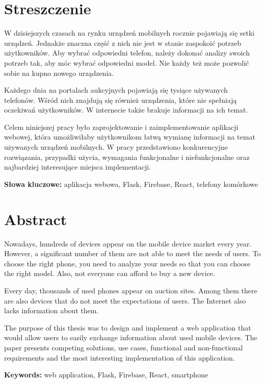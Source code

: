 \section*{Streszczenie}
W dzisiejszych czasach na rynku urządzeń mobilnych rocznie pojawiają się setki urządzeń. Jednakże znaczna część z nich nie jest w stanie zaspokoić potrzeb użytkowników. Aby wybrać odpowiedni telefon, należy dokonać analizy swoich potrzeb tak, aby móc wybrać odpowiedni model. Nie każdy też może pozwolić sobie na kupno nowego urządzenia.

Każdego dnia na portalach aukcyjnych pojawiają się tysiące używanych telefonów. Wśród nich znajdują się również urządzenia, które nie spełniają oczekiwań użytkowników. W internecie także brakuje informacji na ich temat.

Celem niniejszej pracy było zaprojektowanie i zaimplementowanie aplikacji webowej, która umożliwiłaby użytkownikom łatwą wymianę informacji na temat używanych urządzeń mobilnych. W pracy przedstawiono konkurencyjne rozwiązania, przypadki użycia, wymagania funkcjonalne i niefunkcjonalne oraz najbardziej interesujące miejsca implementacji.

\textbf{Słowa kluczowe:} aplikacja webowa, Flask, Firebase, React, telefony komórkowe

\section*{Abstract}
Nowadays, hundreds of devices appear on the mobile device market every year. However, a significant number of them are not able to meet the needs of users. To choose the right phone, you need to analyze your needs so that you can choose the right model. Also, not everyone can afford to buy a new device.

Every day, thousands of used phones appear on auction sites. Among them there are also devices that do not meet the expectations of users. The Internet also lacks information about them.  

The purpose of this thesis was to design and implement a web application that would allow users to easily exchange information about used mobile devices. The paper presents competing solutions, use cases, functional and non-functional requirements and the most interesting implementation of this application.

\textbf{Keywords:} web application, Flask, Firebase, React, smartphone
